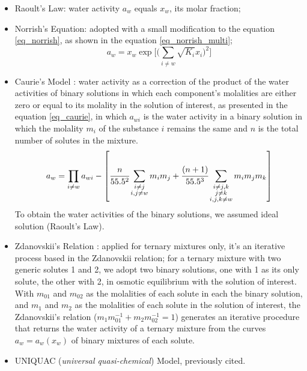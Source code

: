 \documentclass[
	12pt,				%
	openright,
	twoside,
	a4paper,			%
	brazil,			%
	french,				%
	english				%
	]{abntex2}
\begin{document}
\begin{itemize}
	\item Raoult's Law: water activity $a_w$ equals $x_w$,
		its molar fraction;
	\item Norrish's Equation: adopted with a small modification to the equation
		\ref{eq_norrish}, as shown in the equation \ref{eq_norrish_multi};
		\begin{equation}
			\label{eq_norrish_multi}
			a_w = x_w\exp\Big[\Big(\sum_{i \neq w}%
			\sqrt{K_i}x_i\Big)^2\Big]
		\end{equation}
	\item Caurie's Model \cite{caurie1986}: water activity as a correction
		of the product of the water activities of binary solutions
		in which each component's molalities are either zero or equal
		to its molality in the solution of interest, as presented
		in the equation \ref{eq_caurie}, in which $a_{wi}$ is the
		water activity in a binary solution in which the molality $m_i$
		of the substance $i$ remains the same and $n$ is the total number
		of solutes in the mixture.
		\begin{equation}
			\label{eq_caurie}
			a_w = \prod_{i \neq w}a_{wi}-\left[\cfrac{n}%
			{55.5^2}\sum_{\substack{i \neq j \\ i,j \neq w}}%
			m_im_j + \cfrac{(n+1)}{55.5^3}\sum_{%
			\substack{i\neq j,k \\ j \neq k \\  i,j,k \neq w}}%
			m_im_jm_k\right]
		\end{equation}
		To obtain the water activities of the binary solutions,
		we assumed ideal solution (Raoult's Law).
	\item Zdanovskii's Relation \cite{chen1973,sangster1973}:
		applied for ternary mixtures only, it's an iterative process
		based in the Zdanovskii relation; for a ternary mixture with
		two generic solutes 1 and 2, we adopt two binary solutions, one
		with 1 as its only solute, the other with 2, in osmotic equilibrium
		with the solution of interest. With $m_{01}$ and $m_{02}$ as the
		molalities of each solute in each the binary solution, and
		$m_1$ and $m_2$ as the molalities of each solute in the solution
		of interest, the Zdanovskii's relation ($m_1m_{01}^{-1} +
		m_2m_{02}^{-1} = 1$) generates an iterative procedure that
		returns the water activity of a ternary mixture from the
		curves $a_w=a_w(x_w)$ of binary mixtures of each solute.
	\item UNIQUAC (\textit{universal quasi-chemical}) Model, previously
		cited.
\end{itemize}
\end{document}
